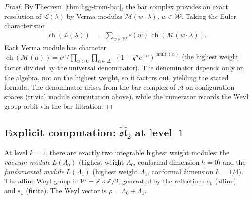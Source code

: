 \begin{proof}
By Theorem~\ref{thm:bgg-from-bar}, the bar complex provides
an exact resolution of $\mathcal{L}(\lambda)$ by Verma modules
$\mathcal{M}(w \cdot \lambda)$, $w \in \mathcal{W}$.
Taking the Euler characteristic:
\begin{align}
\operatorname{ch}(\mathcal{L}(\lambda))
&= \sum_{w \in \mathcal{W}} \varepsilon(w)\,
   \operatorname{ch}(\mathcal{M}(w \cdot \lambda)).
\end{align}
Each Verma module has character
$\operatorname{ch}(\mathcal{M}(\mu))
= e^{\mu} / \prod_{n > 0} \prod_{\alpha \in \Delta^+}
(1 - q^n e^{-\alpha})^{\operatorname{mult}(\alpha)}$
(the highest weight factor divided by the universal
denominator).  The denominator depends only on the algebra,
not on the highest weight, so it factors out, yielding
the stated formula.  The denominator arises from the bar complex
of $\mathcal{A}$ on configuration spaces
(trivial module computation above), while the numerator
records the Weyl group orbit via the bar filtration.
\end{proof}

\subsection{\texorpdfstring{Explicit computation: $\widehat{\mathfrak{sl}}_2$ at level~$1$}{Explicit computation: affine sl2 at level 1}}
\label{sec:sl2-level1-computation}

\begin{example}
\label{ex:sl2-level1}
At level $k=1$, there are exactly two integrable highest weight modules: the \emph{vacuum module} $L(\Lambda_0)$ (highest weight $\Lambda_0$, conformal dimension $h=0$) and the \emph{fundamental module} $L(\Lambda_1)$ (highest weight $\Lambda_1$, conformal dimension $h = 1/4$).
The affine Weyl group is $\mathcal{W} = \mathbb{Z} \rtimes \mathbb{Z}/2$,
generated by the reflections $s_0$ (affine) and $s_1$ (finite).
The Weyl vector is $\rho = \Lambda_0 + \Lambda_1$.
\end{example}

